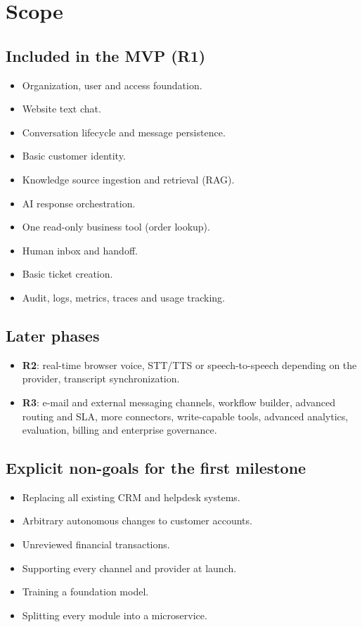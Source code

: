 \section{Scope}
\subsection{Included in the MVP (R1)}
\begin{itemize}
  \item Organization, user and access foundation.
  \item Website text chat.
  \item Conversation lifecycle and message persistence.
  \item Basic customer identity.
  \item Knowledge source ingestion and retrieval (RAG).
  \item AI response orchestration.
  \item One read-only business tool (order lookup).
  \item Human inbox and handoff.
  \item Basic ticket creation.
  \item Audit, logs, metrics, traces and usage tracking.
\end{itemize}

\subsection{Later phases}
\begin{itemize}
  \item \textbf{R2}: real-time browser voice, STT/TTS or speech-to-speech depending on the provider, transcript synchronization.
  \item \textbf{R3}: e-mail and external messaging channels, workflow builder, advanced routing and SLA, more connectors, write-capable tools, advanced analytics, evaluation, billing and enterprise governance.
\end{itemize}

\subsection{Explicit non-goals for the first milestone}
\begin{itemize}
  \item Replacing all existing CRM and helpdesk systems.
  \item Arbitrary autonomous changes to customer accounts.
  \item Unreviewed financial transactions.
  \item Supporting every channel and provider at launch.
  \item Training a foundation model.
  \item Splitting every module into a microservice.
\end{itemize}

